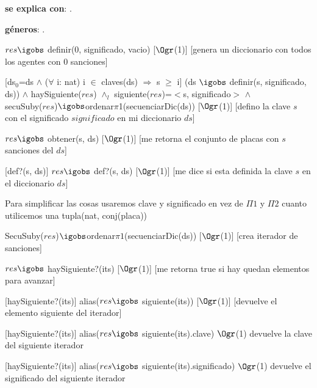 \begin{Interfaz}

	\textbf{se explica con}: .

	\textbf{géneros}: .


	{$res \igobs$ definir($0$, significado, vacio)}
	[$\Ogr$(1)]
	[genera un diccionario con todos los agentes con $0$ sanciones]

	[ds$_0$=ds $\land$ ($\forall$ i: nat) i $\in$ claves(ds) $\Rightarrow$ s $\geq$ i]
	{(ds $\igobs$ definir(s, significado, ds)) $\land$ haySiguiente($res$) $\land_l$ siguiente($res$)=$<$s, significado$>$ $\land$\\
	secuSuby($res$)$\igobs$ordenar$\pi$1(secuenciarDic(ds))}%
	[$\Ogr$(1)]
	[defino la clave $s$ con el significado $significado$ en mi diccionario $ds$]
	
	{$res \igobs$ obtener(s, ds)}
	[$\Ogr$(1)]
	[me retorna el conjunto de placas con $s$ sanciones del $ds$]

	[def?(s, ds)]
	{$res \igobs$ def?(s, ds)}  
	[$\Ogr$(1)]
	[me dice si esta definida la clave $s$ en el diccionario $ds$]
	
	
	
	Para simplificar las cosas usaremos clave y significado en vez de $\Pi1$ y $\Pi2$ cuanto utilicemos una tupla(nat, conj(placa))
	
	{SecuSuby($res$)$\igobs$ordenar$\pi1$(secuenciarDic(ds))}
	[$\Ogr$(1)]
	[crea iterador de sanciones]
	
	{$res \igobs$ haySiguiente?(its)}
	[$\Ogr$(1)]
	[me retorna true si hay quedan elementos para avanzar]
	
	[haySiguiente?(its)]
	{alias($res \igobs$ siguiente(its))}
	[$\Ogr$(1)]
	[devuelve el elemento siguiente del iterador]
	
	[haySiguiente?(its)]
	{alias($res \igobs$ siguiente(its).clave)}
	{$\Ogr$(1)}
	{devuelve la clave del siguiente iterador}
	
	[haySiguiente?(its)]
	{alias($res \igobs$ siguiente(its).significado)}
	{$\Ogr$(1)}
	{devuelve el significado del siguiente iterador}


\end{Interfaz}

